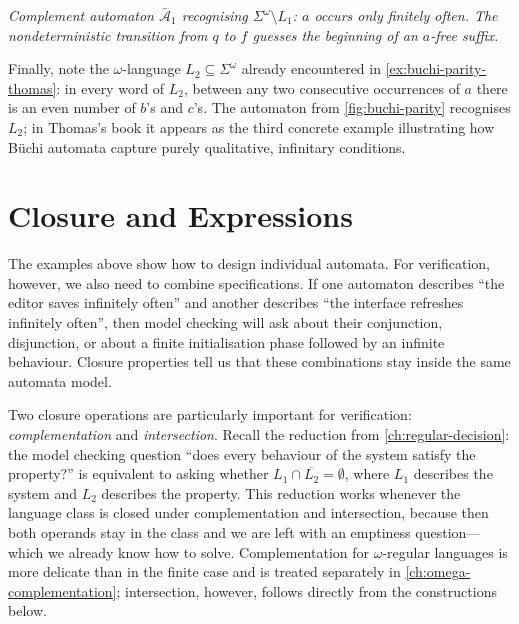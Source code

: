 \begin{example}
\begin{center}
\medskip
{\small\itshape Complement automaton $\bar{\mathcal{A}}_1$ recognising $\Sigma^\omega\setminus L_1$: $a$ occurs only finitely often.  The nondeterministic transition from $q$ to $f$ guesses the beginning of an $a$-free suffix.}
\end{center}


Finally, note the $\omega$-language $L_2\subseteq\Sigma^\omega$ already encountered in \cref{ex:buchi-parity-thomas}: in every word of $L_2$, between any two consecutive occurrences of $a$ there is an even number of $b$'s and $c$'s.  The automaton from \cref{fig:buchi-parity} recognises $L_2$; in Thomas's book it appears as the third concrete example illustrating how B\"uchi automata capture purely qualitative, infinitary conditions.
\end{example}


\section{Closure and Expressions}
\label{sec:omega-closure-expressions}

The examples above show how to design individual automata.  For
verification, however, we also need to combine specifications.  If one
automaton describes ``the editor saves infinitely often'' and another
describes ``the interface refreshes infinitely often'', then model
checking will ask about their conjunction, disjunction, or about a finite
initialisation phase followed by an infinite behaviour.  Closure
properties tell us that these combinations stay inside the same automata
model.

Two closure operations are particularly important for verification:
\emph{complementation} and \emph{intersection}.  Recall the
reduction from \cref{ch:regular-decision}: the model checking question
``does every behaviour of the system satisfy the property?'' is equivalent
to asking whether $L_1 \cap \overline{L_2} = \emptyset$, where $L_1$
describes the system and $L_2$ describes the property.  This reduction
works whenever the language class is closed under complementation and
intersection, because then both operands stay in the class and we are
left with an emptiness question---which we already know how to solve.
Complementation for $\omega$-regular languages is more delicate than in
the finite case and is treated separately in
\cref{ch:omega-complementation}; intersection, however, follows directly
from the constructions below.

